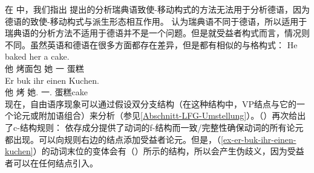     在 \citet{MWArgSt}中，我们指出 \citet{ADT2008a,ADT2013a}提出的分析瑞典语致使-移动构式的方法无法用于分析德语，因为德语的致使-移动构式与派生形态相互作用。 \citet{AT2014a}认为瑞典语不同于德语，所以适用于瑞典语的分析方法不适用于德语并不是一个问题。但是就受益者构式而言，情况则不同。虽然英语和德语在很多方面都存在差异，但是都有相似的与格构式：
\eal
\ex 
\gll He baked her a cake.\\
     他 烤面包 她 一 蛋糕\\
\ex
\label{ex-er-buk-ihr-einen-kuchen} 
\gll Er buk   ihr        einen Kuchen.\\
     他 烤 她.\dat{} 一.\acc{} 蛋糕cake\\
\zl
现在，自由语序现象可以通过假设双分支结构（在这种结构中，VP结点与它的一个论元或附加语组合）来分析（参见\ref{Abschnitt-LFG-Umstellung}）。（）再次给出了c-结构规则：
\ea
\label{lfg-vp-regel-two}
\z
依存成分提供了动词的f-结构而一致/完整性确保动词的所有论元都出现。可以向规则右边的结点添加受益者论元。但是，（\ref{ex-er-buk-ihr-einen-kuchen}）的动词末位的变体会有（）所示的结构，所以会产生伪歧义，因为受益者可以在任何结点引入。

